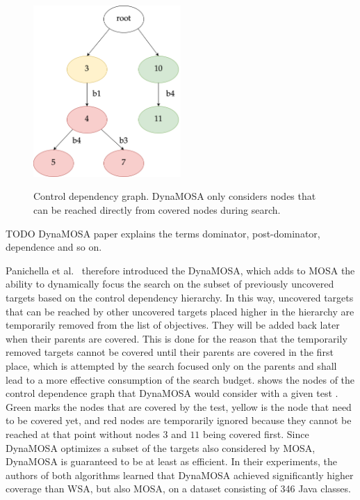 \documentclass[paper=a4,%
  twoside,%
  BCOR4mm,%
  abstract=true,%
  toc=bibliography,%
  chapterprefix=true,%
  toc=bibliographynumbered,%
  open=right,%
  english,%
  pagesize=pdftex]{scrreprt}
\begin{document}
\begin{figure}[h]
\caption{Control dependency graph. DynaMOSA only considers nodes that can be reached directly from covered nodes during search.}
\centering
\includegraphics[width=0.5\textwidth]{cdg-code-example}
\label{fig:example-control-dependencies}
\end{figure}

TODO DynaMOSA paper explains the terms dominator, post-dominator, dependence and so on.

Panichella et al.~\cite{Panichella2018} therefore introduced the \ac{DynaMOSA}, which adds to \ac{MOSA} the ability to dynamically focus the search on the subset of previously uncovered targets based on the control dependency hierarchy. In this way, uncovered targets that can be reached by other uncovered targets placed higher in the hierarchy are temporarily removed from the list of objectives. They will be added back later when their parents are covered. This is done for the reason that the temporarily removed targets cannot be covered until their parents are covered in the first place, which is attempted by the search focused only on the parents and shall lead to a more effective consumption of the search budget.  shows the nodes of the control dependence graph that \ac{DynaMOSA} would consider with a given test . Green marks the nodes that are covered by the test, yellow is the node that need to be covered yet, and red nodes are temporarily ignored because they cannot be reached at that point without nodes $3$ and $11$ being covered first. Since \ac{DynaMOSA} optimizes a subset of the targets also considered by \ac{MOSA}, \ac{DynaMOSA} is guaranteed to be at least as efficient. In their experiments, the authors of both algorithms learned that \ac{DynaMOSA} achieved significantly higher coverage than \ac{WSA}, but also \ac{MOSA}, on a dataset consisting of 346 Java classes.
\end{document}
